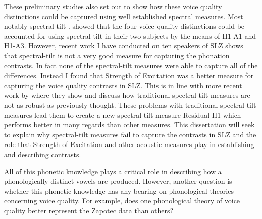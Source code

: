 \documentclass[12pt, letterpaper]{article}
\begin{document}
These preliminary studies also set out to show how these voice quality distinctions could be captured using well established spectral measures. Most notably spectral-tilt \citep{fischer-jorgensenPhoneticAnalysisBreathy1968}. \citet{adlerAcousticsPhonationTypes2016} showed that the four voice quality distinctions could be accounted for using spectral-tilt in their two subjects by the means of H1-A1 and H1-A3. However, recent work I have conducted on ten speakers of SLZ shows that spectral-tilt is not a very good measure for capturing the phonation contrasts. In fact none of the spectral-tilt measures were able to capture all of the differences. Instead I found that Strength of Excitation \citep{murtyEpochExtractionSpeech2008,mittalStudyEffectsVocal2014} was a better measure for capturing the voice quality contrasts in SLZ. This is in line with more recent work by \citet{chaiH1H2Acoustic2022} where they show and discuss how traditional spectral-tilt measures are not as robust as previously thought. These problems with traditional spectral-tilt measures lead them to create a new spectral-tilt measure Residual H1 which performs better in many regards than other measures. This dissertation will seek to explain why spectral-tilt measures fail to capture the contrasts in SLZ and the role that Strength of Excitation and other acoustic measures play in establishing and describing contrasts. 

All of this phonetic knowledge plays a critical role in describing how a phonologically distinct vowels are produced. However, another question is whether this phonetic knowledge has any bearing on phonological theories concerning voice quality. For example, does one phonological theory of voice quality better represent the Zapotec data than others?
\end{document}
